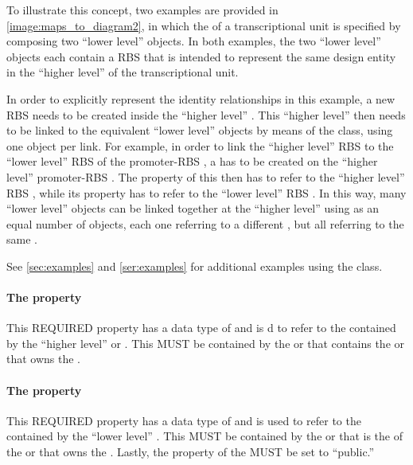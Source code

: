 To illustrate this concept, two examples are provided in \ref{image:maps_to_diagram2}, in which the  of a transcriptional unit is specified by composing two ``lower level''  objects.
In both examples, the two ``lower level''  objects each contain a RBS  that is intended to represent the same design entity in the ``higher level''  of the transcriptional unit.

In order to explicitly represent the identity relationships in this example, a new RBS  needs to be created inside the ``higher level'' .
This ``higher level''  then needs to be linked to the equivalent ``lower level''  objects by means of the  class, using one  object per link.
For example, in order to link the ``higher level'' RBS  to the ``lower level'' RBS  of the promoter-RBS , a  has to be created on the ``higher level'' promoter-RBS . The  property of this  then has to refer to the ``higher level'' RBS , while its  property has to refer to the ``lower level'' RBS .
In this way, many ``lower level''  objects can be linked together at the ``higher level'' using as an equal number of  objects, each one referring to a different  , but all referring to the same  .

See \ref{sec:examples} and \ref{ser:examples} for additional examples using the  class.

\paragraph{The  property}\label{sec:local}
This REQUIRED property has a data type of  and is 
d to refer to the  contained by the ``higher level''  or . This   MUST be contained by the  or  that contains the  or  that owns the .

\paragraph{The  property}\label{sec:remote}
This REQUIRED property has a data type of  and is used to refer to the  contained by the ``lower level'' .
This   MUST be contained by the  or  that is the  of the  or  that owns the .
Lastly, the  property of the   MUST be set to ``public.''

